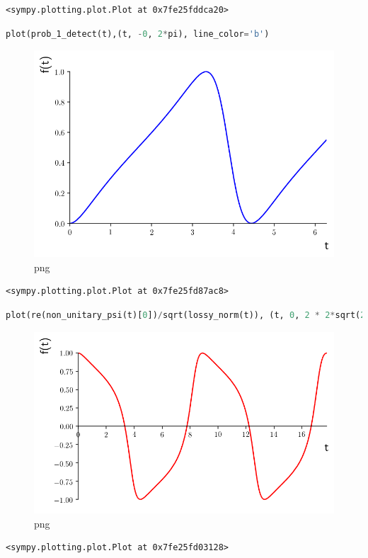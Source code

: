 \begin{lstlisting}
<sympy.plotting.plot.Plot at 0x7fe25fddca20>
\end{lstlisting}

\begin{lstlisting}[language=Python]
plot(prob_1_detect(t),(t, -0, 2*pi), line_color='b')
\end{lstlisting}

\begin{figure}
\centering
\includegraphics[width=0.6\linewidth]{output_35_0.png}
\caption{png}
\end{figure}

\begin{lstlisting}
<sympy.plotting.plot.Plot at 0x7fe25fd87ac8>
\end{lstlisting}

\begin{lstlisting}[language=Python]
plot(re(non_unitary_psi(t)[0])/sqrt(lossy_norm(t)), (t, 0, 2 * 2*sqrt(2)*pi), line_color='r')
\end{lstlisting}

\begin{figure}
\centering
\includegraphics[width=0.6\linewidth]{output_36_0.png}
\caption{png}
\end{figure}

\begin{lstlisting}
<sympy.plotting.plot.Plot at 0x7fe25fd03128>
\end{lstlisting}

